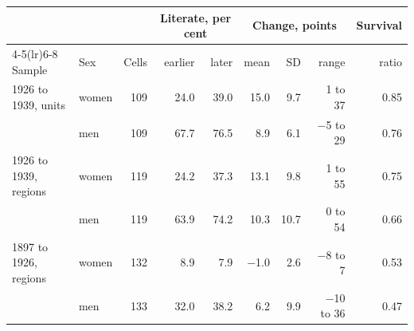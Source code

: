 \begin{tabular}{llrrrrrrr}
\toprule
 & & & \multicolumn{2}{c}{Literate, per cent} & \multicolumn{3}{c}{Change, points} & Survival \\
\cmidrule(lr){4-5}\cmidrule(lr){6-8}
Sample & Sex & Cells & earlier & later & mean & SD & range & ratio \\
\midrule
1926 to 1939, units & women & 109 & 24.0 & 39.0 & 15.0 & 9.7 & 1 to 37 & 0.85 \\
 & men & 109 & 67.7 & 76.5 & 8.9 & 6.1 & $-$5 to 29 & 0.76 \\
1926 to 1939, regions & women & 119 & 24.2 & 37.3 & 13.1 & 9.8 & 1 to 55 & 0.75 \\
 & men & 119 & 63.9 & 74.2 & 10.3 & 10.7 & 0 to 54 & 0.66 \\
1897 to 1926, regions & women & 132 & 8.9 & 7.9 & $-$1.0 & 2.6 & $-$8 to 7 & 0.53 \\
 & men & 133 & 32.0 & 38.2 & 6.2 & 9.9 & $-$10 to 36 & 0.47 \\
\bottomrule
\end{tabular}
